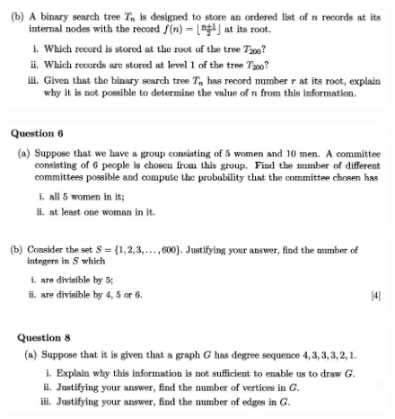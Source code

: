 \documentclass[]{article}
\begin{document}
\newpage
\begin{figure}[h!]
	\centering    
	\includegraphics[width=1.5\linewidth]{"HC 2012 ZA Q5b"} 
\end{figure}
\newpage
\begin{figure}[h!]
	\centering    
	\includegraphics[width=1.5\linewidth]{"HC 2012 ZA Q6a"} 
\end{figure}
\newpage
\begin{figure}[h!]
	\centering    
	\includegraphics[width=1.5\linewidth]{"HC 2012 ZA Q6b"} 
\end{figure}
\newpage
\begin{figure}[h!]
	\centering    
	\includegraphics[width=1.5\linewidth]{"HC 2012 ZA Q8a"}    
\end{figure}
\end{document}
